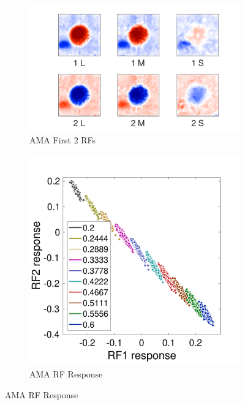 \documentclass{jov}
\begin{document}
\begin{figure}
\centering
    \begin{subfigure}[b]{0.27 \textwidth}   
        \includegraphics[width=\textwidth]{../Figures/Figure9/Figure9_a.pdf}
        \caption{AMA First 2 RFs}
        \label{fig:case9AMA}
    \end{subfigure}
        \begin{subfigure}[b]{0.20 \textwidth}
        \includegraphics[width=\textwidth]{../Figures/Figure9/Figure9_b.pdf}
        \caption{AMA RF Response}
        \label{fig:case9FiltersResponse}
    \end{subfigure}

\end{figure}
\end{document}

